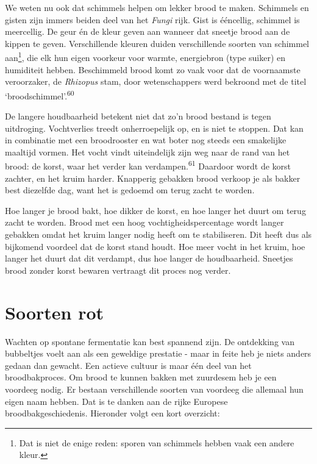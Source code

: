\documentclass[
  11pt,
  dutch,
]{memoir}
\begin{document}
We weten nu ook dat schimmels helpen om lekker brood te maken. Schimmels
en gisten zijn immers beiden deel van het \emph{Fungi} rijk. Gist is
ééncellig, schimmel is meercellig. De geur én de kleur geven aan wanneer
dat sneetje brood aan de kippen te geven. Verschillende kleuren duiden
verschillende soorten van schimmel aan\footnote{Dat is niet de enige
  reden: sporen van schimmels hebben vaak een andere kleur.}, die elk
hun eigen voorkeur voor warmte, energiebron (type suiker) en humiditeit
hebben. Beschimmeld brood komt zo vaak voor dat de voornaamste
veroorzaker, de \emph{Rhizopus} stam, door wetenschappers werd bekroond
met de titel `broodschimmel'.\textsuperscript{60}

De langere houdbaarheid betekent niet dat zo'n brood bestand is tegen
uitdroging. Vochtverlies treedt onherroepelijk op, en is niet te
stoppen. Dat kan in combinatie met een broodrooster en wat boter nog
steeds een smakelijke maaltijd vormen. Het vocht vindt uiteindelijk zijn
weg naar de rand van het brood: de korst, waar het verder kan
verdampen.\textsuperscript{61} Daardoor wordt de korst zachter, en het
kruim harder. Knapperig gebakken brood verkoop je als bakker best
diezelfde dag, want het is gedoemd om terug zacht te worden.

Hoe langer je brood bakt, hoe dikker de korst, en hoe langer het duurt
om terug zacht te worden. Brood met een hoog vochtigheidspercentage
wordt langer gebakken omdat het kruim langer nodig heeft om te
stabiliseren. Dit heeft dus als bijkomend voordeel dat de korst stand
houdt. Hoe meer vocht in het kruim, hoe langer het duurt dat dit
verdampt, dus hoe langer de houdbaarheid. Sneetjes brood zonder korst
bewaren vertraagt dit proces nog verder.

\hypertarget{soorten-rot}{%
\section{Soorten rot}\label{soorten-rot}}

Wachten op spontane fermentatie kan best spannend zijn. De ontdekking
van bubbeltjes voelt aan als een geweldige prestatie - maar in feite heb
je niets anders gedaan dan gewacht. Een actieve cultuur is maar één deel
van het broodbakproces. Om brood te kunnen bakken met zuurdesem heb je
een voordeeg nodig. Er bestaan verschillende soorten van voordeeg die
allemaal hun eigen naam hebben. Dat is te danken aan de rijke Europese
broodbakgeschiedenis. Hieronder volgt een kort overzicht:
\end{document}
